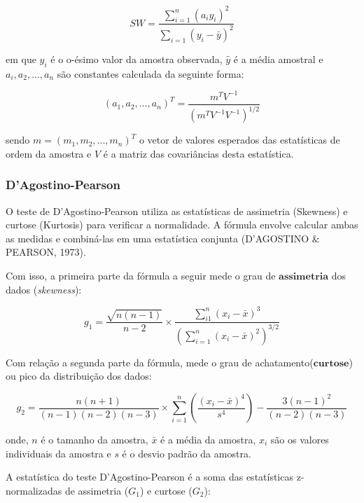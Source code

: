 \documentclass[a4paper,11pt]{article} %
\begin{document}
\begin{equation}
    SW = \frac{\sum_{i=1}^{n} (a_{i}y_{i})^{2}}{\sum_{i=1}  (y_{i} - \bar{y})^{2}}
\end{equation}

em que $y_{i}$ é o o-ésimo valor da amostra observada, $\hat{y}$ é a média amostral e $a_{i},a_{2},...,a_{n}$ são constantes calculada da seguinte forma:

\begin{equation}
    (a_{1},a_{2},...,a_{n})^{T} = \frac{m^{T}V^{-1}}{(m^{T}V^{-1}V^{-1} )^{1/2}}
\end{equation}

sendo $m=(m_{1},m_{2},...,m_{n})^{T}$ o vetor de valores esperados das estatísticas de ordem da amostra e $V$ é a matriz das covariâncias desta estatística.\vskip0.3cm

\subsubsection{D’Agostino-Pearson}

O teste de D'Agostino-Pearson utiliza as estatísticas de assimetria (Skewness) e curtose (Kurtosis) para verificar a normalidade. A fórmula envolve calcular ambas as medidas e combiná-las em uma estatística conjunta (D'AGOSTINO \& PEARSON, 1973).\vskip0.3cm

Com isso, a primeira parte da fórmula a seguir mede o grau de $\textbf{assimetria}$ dos dados (\textit{skewness}):

\begin{equation}
g_{1} = \frac{\sqrt{n(n-1)}}{n-2} \times \frac{\sum_{i1}^{n} (x_{i}-\bar{x})^{3}}{\left( \sum_{i=1}^{n} (x_{i}-\bar{x})^{2}\right)^{3/2}}
\end{equation}

Com relação a segunda parte da fórmula, mede o grau de achatamento($\textbf{curtose}$) ou pico da distribuição dos dados:

\begin{equation}
g_{2} = \frac{n(n+1)}{(n-1)(n-2)(n-3)} \times \sum_{i=1}^{n} \left(  \frac{(x_{i}-\bar{x})^{4}}{s^{4}} \right) - \frac{3(n-1)^{2}}{(n-2)(n-3)}
\end{equation}

onde, $n$ é o tamanho da amostra, $\bar{x}$ é a média da amostra, $x_{i}$ são os valores individuais da amostra e $s$ é o desvio padrão da amostra.\vskip0.3cm

A estatística do teste  D'Agostino-Pearson é a soma das estatísticas z-normalizadas de assimetria ($G_{1}$) e curtose ($G_{2}$):\vskip0.3cm
\end{document}
